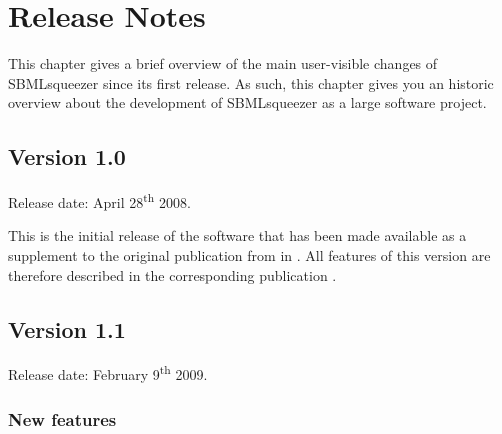 \chapter{Release Notes}

This chapter gives a brief overview of the main user-visible changes of
SBMLsqueezer since its first release. As such, this chapter gives you an
historic overview about the development of SBMLsqueezer as a large software
project.  

\section{Version 1.0}

Release date: April 28\textsuperscript{th} 2008.

This is the initial release of the software that has been made available as
a supplement to the original publication from in \citeyear{Draeger2008}. All
features of this version are therefore described in the corresponding
publication \cite{Draeger2008}.

\section{Version 1.1}

Release date: February 9\textsuperscript{th} 2009.

\subsection{New features}

